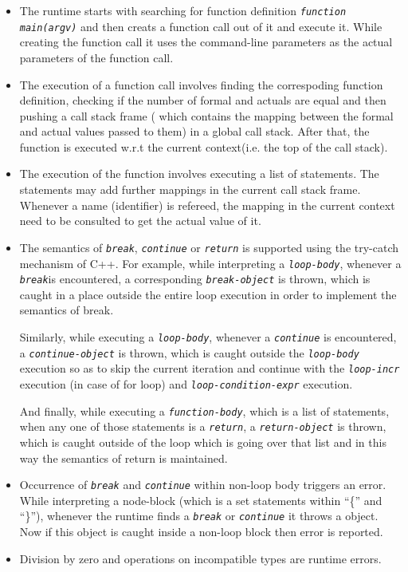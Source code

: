 \documentclass[12,twoside]{article}
\begin{document}
\begin{itemize}

  \item The runtime starts with searching for function definition
  {\tt\emph{function main(argv)}} and then creats a function call out of it and 
  execute it.  While creating the function call it uses the command-line 
  parameters as the actual parameters of the function call.

  \item The execution of a function call involves finding the correspoding 
  function definition, checking if the number of formal and actuals are equal 
  and then pushing a call stack frame ( which contains the mapping between the 
      formal and actual values passed to them) in a global call stack. After 
  that, the function
  is executed w.r.t the current context(i.e. the top of the call stack).

  \item The execution of the function involves executing a list of statements.
  The statements may add further mappings in the current call stack frame.
  Whenever a name (identifier) is refereed, the mapping in the current context 
  need to be consulted to get the actual value of it. 

  \item The semantics of {\tt\emph{break}}, {\tt\emph{continue}} or 
{\tt\emph{return}} is supported using the try-catch mechanism of C++.
  For example, while interpreting a {\tt\emph{loop-body}}, whenever a {\tt\emph{break}}is 
  encountered, a corresponding {\tt\emph{break-object}} is thrown, which is caught in a place 
  outside the entire loop execution in order to implement the semantics of break. 

  Similarly, while executing a {\tt\emph{loop-body}}, whenever a 
{\tt\emph{continue}} is encountered, a {\tt\emph{continue-object}} is thrown, which is caught outside
  the {\tt\emph{loop-body}} execution so as to skip the current iteration 
    and continue with the {\tt\emph{loop-incr}} execution (in case of for loop) 
    and {\tt\emph{loop-condition-expr}} execution.

  And finally, while executing a  {\tt\emph{function-body}}, which is a list
  of statements, when any one of those statements is a {\tt\emph{return}}, a 
  {\tt\emph{return-object}} is thrown, which is caught outside of the loop
  which is going over that list and in this way the semantics of return is 
    maintained.
  
  \item Occurrence of {\tt\emph{break}} and {\tt\emph{continue}} within non-loop
    body triggers an error. While interpreting a node-block (which is a set 
        statements within ``\{'' and ``\}''), whenever the runtime finds a 
{\tt\emph{break}} or  {\tt\emph{continue}} it throws a object. Now if this 
object is caught
  inside a non-loop block then error is reported.

  \item Division by zero and operations on incompatible types are runtime 
  errors.  
  
  \end{itemize}
\end{document}
